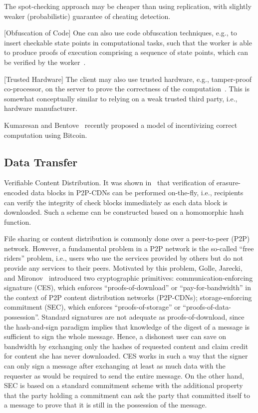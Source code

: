 The spot-checking approach may be cheaper than using replication, with slightly weaker (probabilistic) guarantee of cheating detection.

[Obfuscation of Code]
One can also use code obfuscation techniques, e.g., to insert checkable state points in computational tasks, such that the worker is able to produce proofs of execution comprising a sequence of state points, which can be verified by the worker~\cite{Hoh98, MWR99}.

[Trusted Hardware]
The client may also use trusted hardware, e.g., tamper-proof co-processor, on the server to prove the correctness of the computation~\cite{SPD05}. This is somewhat conceptually similar to relying on a weak trusted third party, i.e., hardware manufacturer.

Kumaresan and Bentove~\cite{KB14} recently proposed a model of incentivizing correct computation using Bitcoin. 


\subsection{Data Transfer}

Verifiable Content Distribution. It was shown in~\cite{KFM04} that verification of erasure-encoded data blocks in P2P-CDNs can be performed on-the-fly, i.e., recipients can verify the integrity of check blocks immediately as each data block is downloaded. Such a scheme can be constructed based on a homomorphic hash function.

File sharing or content distribution is commonly done over a peer-to-peer (P2P) network. However, a fundamental problem in a P2P network is the so-called ``free riders'' problem, i.e., users who use the services provided by others but do not provide any services to their peers. 
Motivated by this problem, Golle, Jarecki, and Mironov~\cite{GJM02} introduced two cryptographic primitives:
communication-enforcing signature (CES), which enforces ``proofs-of-download'' or ``pay-for-bandwidth'' in the context of P2P content distribution networks (P2P-CDNs);
storage-enforcing commitment (SEC), which enforces ``proofs-of-storage'' or ``proofs-of-data-possession''.
Standard signatures are not adequate as proofs-of-download, since the hash-and-sign paradigm implies that knowledge of the digest of a message is sufficient to sign the whole message. Hence, a dishonest user can save on bandwidth by exchanging only the hashes of requested content and claim credit for content she has never downloaded. CES works in such a way that the signer can only sign a message after exchanging at least as much data with the requester as would be required to send the entire message. On the other hand, SEC is based on a standard commitment scheme with the additional property that the party holding a commitment can ask the party that committed itself to a message to prove that it is still in the possession of the message.

